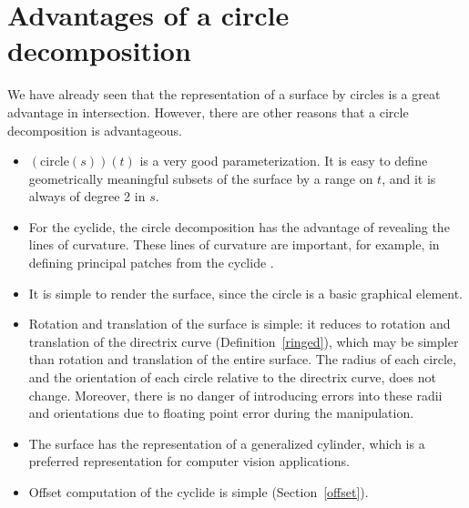 


% 

\section{Advantages of a circle decomposition}
\label{advs}

We have already seen that the representation of a surface by circles
is a great advantage in intersection.
However, there are other reasons that a circle decomposition is advantageous.
\begin{itemize}
\item
	$(\mbox{circle}(s))(t)$ is a very good parameterization.
	It is easy to define geometrically meaningful subsets of 
	the surface by a range on $t$, and it is always of degree 2 in $s$.
\item
	For the cyclide, the circle decomposition has the advantage
	of revealing the lines of curvature.
	These lines of curvature are important, for example,
	in defining principal patches from the cyclide
	\cite{DEP84,MAR82,SHAR85}.
\item
	It is simple to render the surface, since the circle is a basic
	graphical element.
\item
	Rotation and translation of the surface is simple:
	it reduces to rotation and translation of the directrix curve
	(Definition~\ref{ringed}), which may be simpler
	than rotation and translation of the entire surface.
	The radius of each circle,
	and the orientation of each circle relative to the directrix curve,
	does not change.
	Moreover, there is no danger of introducing errors into these 
	radii and orientations due to floating point error 
	during the manipulation.
\item
	The surface has the representation of a generalized cylinder,
	which is a preferred representation for computer vision applications.
\item
	Offset computation of the cyclide is simple (Section~\ref{offset}).
\end{itemize}	

